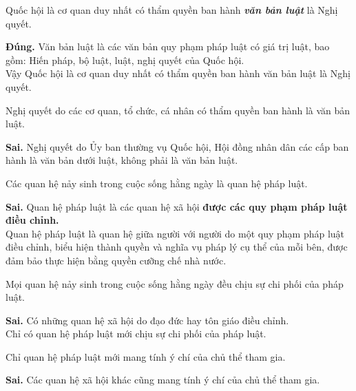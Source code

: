 \begin{ques}
Quốc hội là cơ quan duy nhất có thẩm quyền ban hành \textbf{\textit{văn bản luật}} là Nghị quyết.
\end{ques}
\begin{ans}
\textbf{Đúng.} Văn bản luật là các văn bản quy phạm pháp luật có giá trị luật, bao gồm: Hiến pháp, bộ luật, luật, nghị quyết của Quốc hội.\\
Vậy Quốc hội là cơ quan duy nhất có thẩm quyền ban hành văn bản luật là Nghị quyết.
\end{ans}

\begin{ques}
Nghị quyết do các cơ quan, tổ chức, cá nhân có thẩm quyền ban hành là văn bản luật.
\end{ques}
\begin{ans}
\textbf{Sai.} Nghị quyết do Ủy ban thường vụ Quốc hội, Hội đồng nhân dân các cấp ban hành là văn bản dưới luật, không phải là văn bản luật.
\end{ans}

\begin{ques}
Các quan hệ nảy sinh trong cuộc sống hằng ngày là quan hệ pháp luật.
\end{ques}
\begin{ans}
\textbf{Sai.} Quan hệ pháp luật là các quan hệ xã hội \textbf{được các quy phạm pháp luật điều chỉnh.}\\
Quan hệ pháp luật là quan hệ giữa người với người do một quy phạm pháp luật điều chỉnh, biểu hiện thành quyền và nghĩa vụ pháp lý cụ thể của mỗi bên, được đảm bảo thực hiện bằng quyền cưỡng chế nhà nước.
\end{ans}

\begin{ques}
Mọi quan hệ nảy sinh trong cuộc sống hằng ngày đều chịu sự chi phối của pháp luật.
\end{ques}
\begin{ans}
\textbf{Sai.} Có những quan hệ xã hội do đạo đức hay tôn giáo điều chỉnh.\\
Chỉ có quan hệ pháp luật mới chịu sự chi phối của pháp luật.
\end{ans}

\begin{ques}
Chỉ quan hệ pháp luật mới mang tính ý chí của chủ thể tham gia.
\end{ques}
\begin{ans}
\textbf{Sai.} Các quan hệ xã hội khác cũng mang tính ý chí của chủ thể tham gia.
\end{ans}

